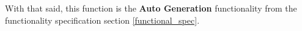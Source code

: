 \begin{itemize}
    
    
    With that said, this function is the \textbf{Auto Generation} functionality from the functionality specification section \ref{functional_spec}.
\end{itemize}


